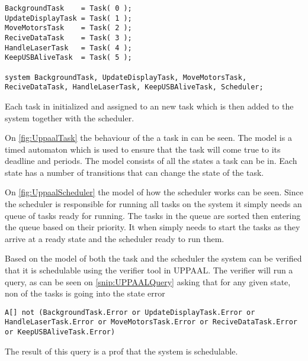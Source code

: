 \begin{lstlisting}[label={snip:UPPAALSystemDeclaration},caption={System declaration from UPPAAL},frame=tlrb,numbers=none]
BackgroundTask    = Task( 0 );
UpdateDisplayTask = Task( 1 );
MoveMotorsTask    = Task( 2 );
ReciveDataTask    = Task( 3 );
HandleLaserTask   = Task( 4 );
KeepUSBAliveTask  = Task( 5 );

system BackgroundTask, UpdateDisplayTask, MoveMotorsTask, ReciveDataTask, HandleLaserTask, KeepUSBAliveTask, Scheduler;
\end{lstlisting}
Each task in initialized and assigned to an new task which is then added to the system together with the scheduler. 

On \autoref{fig:UppaalTask} the behaviour of the a task in can be seen. 
The model is a timed automaton which is used to ensure that the task will come true to its deadline and periods. 
The model consists of all the states a task can be in.
Each state has a number of transitions that can change the state of the task. 


On \autoref{fig:UppaalScheduler} the model of how the scheduler works can be seen. 
Since the scheduler is responsible for running all tasks on the system it simply needs an queue of tasks ready for running. 
The tasks in the queue are sorted then entering the queue based on their priority. 
It when simply needs to start the tasks as they arrive at a ready state and the scheduler ready to run them.


Based on the model of both the task and the scheduler the system can be verified that it is schedulable using the verifier tool in UPPAAL. 
The verifier will run a query, as can be seen on \autoref{snip:UPPAALQuery} asking that for any given state, non of the tasks is going into the state error 
\begin{lstlisting}[label={snip:UPPAALQuery},caption={Query from UPPAAL verifier},frame=tlrb,numbers=none]
A[] not (BackgroundTask.Error or UpdateDisplayTask.Error or HandleLaserTask.Error or MoveMotorsTask.Error or ReciveDataTask.Error or KeepUSBAliveTask.Error)
\end{lstlisting}
The result of this query is a prof that the system is schedulable. 